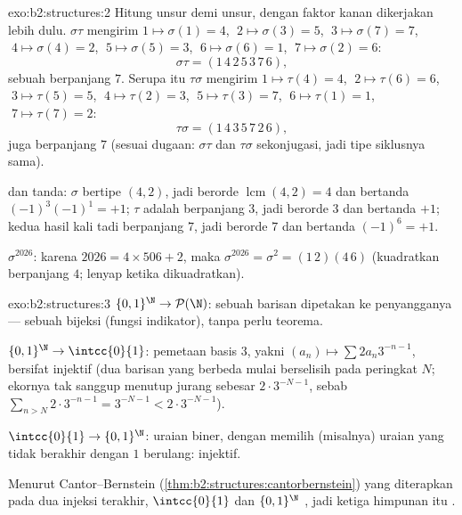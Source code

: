 \begin{solution}{exo:b2:structures:2}
Hitung unsur demi unsur, dengan faktor kanan dikerjakan lebih dulu.
$\sigma\tau$ mengirim $1 \mapsto \sigma(1) = 4$, $\;2 \mapsto \sigma(3)
= 5$, $\;3 \mapsto \sigma(7) = 7$, $\;4 \mapsto \sigma(4) = 2$, $\;5
\mapsto \sigma(5) = 3$, $\;6 \mapsto \sigma(6) = 1$, $\;7 \mapsto
\sigma(2) = 6$:
\[
\sigma\tau = (1\,4\,2\,5\,3\,7\,6),
\]
sebuah  berpanjang $7$. Serupa itu $\tau\sigma$ mengirim $1
\mapsto \tau(4) = 4$, $\;2 \mapsto \tau(6) = 6$, $\;3 \mapsto \tau(5) =
5$, $\;4 \mapsto \tau(2) = 3$, $\;5 \mapsto \tau(3) = 7$, $\;6 \mapsto
\tau(1) = 1$, $\;7 \mapsto \tau(7) = 2$:
\[
\tau\sigma = (1\,4\,3\,5\,7\,2\,6),
\]
juga  berpanjang $7$ (sesuai dugaan: $\sigma\tau$ dan $\tau\sigma$
sekonjugasi, jadi tipe siklusnya sama).

 dan tanda: $\sigma$ bertipe  $(4,2)$, jadi berorde
$\operatorname{lcm}(4,2) = 4$ dan bertanda $(-1)^3(-1)^1 = +1$; $\tau$
adalah  berpanjang $3$, jadi berorde $3$ dan bertanda $+1$; kedua
hasil kali tadi  berpanjang $7$, jadi berorde $7$ dan bertanda
$(-1)^6 = +1$.

$\sigma^{2026}$: karena $2026 = 4 \times 506 + 2$, maka $\sigma^{2026} =
\sigma^2 = (1\,2)(4\,6)$ (kuadratkan  berpanjang $4$; 
lenyap ketika dikuadratkan).
\end{solution}

\begin{solution}{exo:b2:structures:3}
$\{0,1\}^{\N} \to \mathcal{P}(\N)$: sebuah barisan dipetakan ke
penyangganya --- sebuah bijeksi (fungsi indikator), tanpa perlu teorema.

$\{0,1\}^{\N} \to \intcc{0}{1}$: pemetaan basis $3$, yakni $(a_n) \mapsto
\sum 2a_n 3^{-n-1}$, bersifat injektif (dua barisan yang berbeda mulai
berselisih pada peringkat $N$; ekornya tak sanggup menutup jurang sebesar
$2\cdot 3^{-N-1}$, sebab $\sum_{n > N} 2\cdot 3^{-n-1} = 3^{-N-1} <
2\cdot3^{-N-1}$).

$\intcc{0}{1} \to \{0,1\}^{\N}$: uraian biner, dengan memilih (misalnya)
uraian yang tidak berakhir dengan $1$ berulang: injektif.

Menurut Cantor--Bernstein (\cref{thm:b2:structures:cantorbernstein})
yang diterapkan pada dua injeksi terakhir, $\intcc{0}{1}$ dan
$\{0,1\}^{\N}$ , jadi ketiga himpunan itu .
\end{solution}

